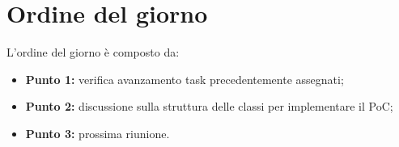 \section{Ordine del giorno}
L'ordine del giorno è composto da: 
\begin{itemize}
	\item \textbf{Punto 1:} verifica avanzamento task precedentemente assegnati;
	\item \textbf{Punto 2:} discussione sulla struttura delle classi per implementare il PoC\glossario;
	\item \textbf{Punto 3:} prossima riunione.
\end{itemize}
